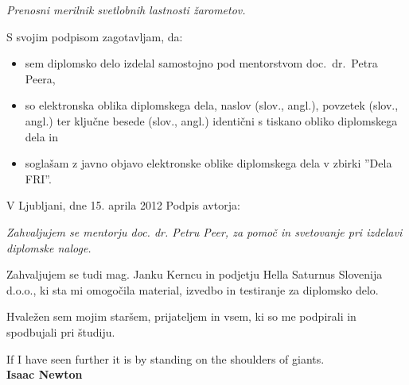 \documentclass[oneside, a4paper, 12pt]{book}
\newcommand{\clearemptydoublepage}{\newpage{\pagestyle{empty}\cleardoublepage}}
\begin{document}
\vspace{0.5cm}
\emph{Prenosni merilnik svetlobnih lastnosti žarometov.}

\vspace{1.5cm}
\noindent S svojim podpisom zagotavljam, da:
\begin{itemize}
	\item sem diplomsko delo izdelal samostojno pod mentorstvom 
		doc.\ dr.\ Petra Peera,

	\item	so elektronska oblika diplomskega dela, naslov (slov., angl.), povzetek (slov., angl.) ter ključne besede (slov., angl.) identični s tiskano obliko diplomskega dela in
	\item soglašam z javno objavo elektronske oblike diplomskega dela v zbirki ''Dela FRI''.
\end{itemize}

\vspace{1cm}
\noindent V Ljubljani, dne 15. aprila 2012 \hfill Podpis avtorja:

\clearemptydoublepage

\thispagestyle{empty}\mbox{}\vfill\null\it%
Zahvaljujem se mentorju doc. dr. Petru Peer, za pomoč in svetovanje pri izdelavi diplomske naloge.

Zahvaljujem se tudi mag. Janku Kerncu in podjetju Hella Saturnus Slovenija d.o.o., ki sta mi omogočila material, izvedbo in testiranje za diplomsko delo.

Hvaležen sem mojim staršem, prijateljem in vsem, ki so me podpirali in spodbujali pri študiju.
\rm\normalfont

\clearemptydoublepage

\thispagestyle{empty}\mbox{}{\textheight}\mbox{}\hfill\begin{minipage}{0.90\textwidth}%
\begin{flushright}
If I have seen further it is by standing on the shoulders of giants.\\
\textbf{Isaac Newton}
\end{flushright}
\normalfont\end{minipage}
 
\clearemptydoublepage

\def\thepage{}%
\tableofcontents{}
\end{document}
